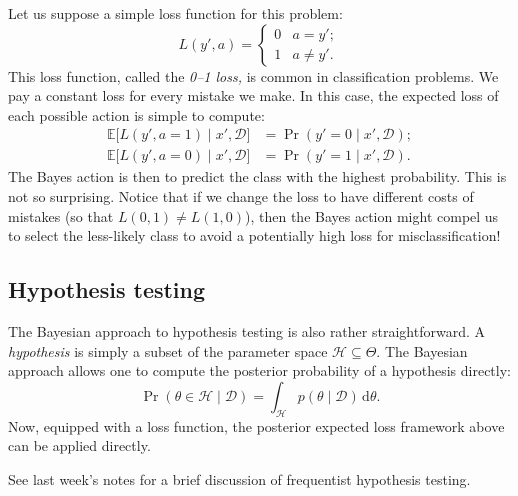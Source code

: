\documentclass{article}
\newcommand{\given}{\mid}
\newcommand{\mc}[1]{\mathcal{#1}}
\newcommand{\data}{\mc{D}}
\newcommand{\intd}[1]{\,\mathrm{d}{#1}}
\begin{document}
Let us suppose a simple loss function for this problem:
\begin{equation*}
  L(y', a) =
  \begin{cases}
    0 & a = y'; \\
    1 & a \neq y'.
  \end{cases}
\end{equation*}
This loss function, called the \emph{0--1 loss,} is common in
classification problems.  We pay a constant loss for every mistake we
make.  In this case, the expected loss of each possible action is
simple to compute:
\begin{align*}
  \mathbb{E}\bigl[L(y', a = 1) \given x', \data\bigr]
  &=
  \Pr(y' = 0 \given x', \data);
  \\
  \mathbb{E}\bigl[L(y', a = 0) \given x', \data\bigr]
  &=
  \Pr(y' = 1 \given x', \data).
\end{align*}
The Bayes action is then to predict the class with the highest
probability.  This is not so surprising.  Notice that if we change the
loss to have different costs of mistakes (so that $L(0, 1) \neq L(1,
0)$), then the Bayes action might compel us to select the less-likely
class to avoid a potentially high loss for misclassification!

\subsection*{Hypothesis testing}

The Bayesian approach to hypothesis testing is also rather
straightforward.  A \emph{hypothesis} is simply a subset of the
parameter space $\mc{H} \subseteq \Theta$.  The Bayesian approach
allows one to compute the posterior probability of a hypothesis
directly:
\begin{equation*}
  \Pr(\theta \in \mc{H} \given \data)
  =
  \int_{\mc{H}}
  p(\theta \given \data)
  \intd{\theta}.
\end{equation*}
Now, equipped with a loss function, the posterior expected loss
framework above can be applied directly.

See last week's notes for a brief discussion of frequentist
hypothesis testing.
\end{document}
